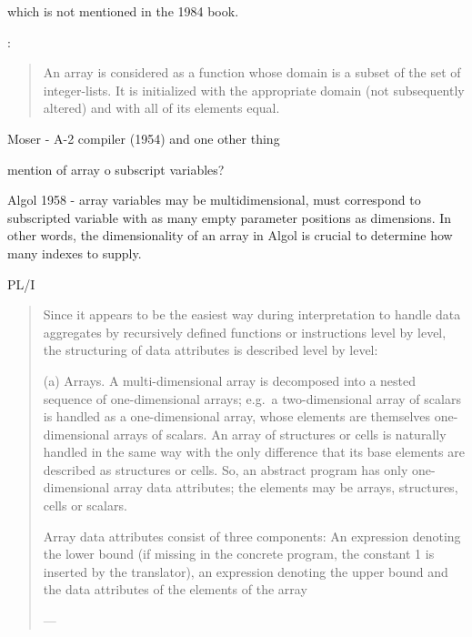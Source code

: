 which is not mentioned in the 1984 book.







\cite{Landin1965}:
\begin{quote}
An array is considered as a function whose domain is a subset of the set of integer-lists.
It is initialized with the appropriate domain (not subsequently altered) and with all of its elements equal.
\end{quote}


Moser - A-2 compiler (1954) and one other thing

mention of array o subscript variables?


Algol 1958 - array variables may be multidimensional, must correspond to subscripted variable with as many empty parameter positions as dimensions.
In other words, the dimensionality of an array in Algol is crucial to determine how many indexes to supply.

PL/I
\begin{quote}
Since it appears to be the
easiest way during interpretation to handle data aggregates by recursively defined
functions or instructions level by level, the structuring of data attributes is
described level by level:

(a)
Arrays. A multi-dimensional array is decomposed into a nested sequence of
one-dimensional arrays; e.g.\ a two-dimensional array of scalars is handled
as a one-dimensional array, whose elements are themselves one-dimensional
arrays of scalars. An array of structures or cells is naturally handled in
the same way with the only difference that its base elements are described
as structures or cells. So, an abstract program has only one-dimensional
array data attributes; the elements may be arrays, structures, cells or
scalars.

Array data attributes consist of three components: An expression denoting
the lower bound (if missing in the concrete program, the constant 1 is inserted
by the translator), an expression denoting the upper bound and the
data attributes of the elements of the array

--- \cite[\S 2.3.1, pp. 2-8--9]{Lucas1968}
\end{quote}

